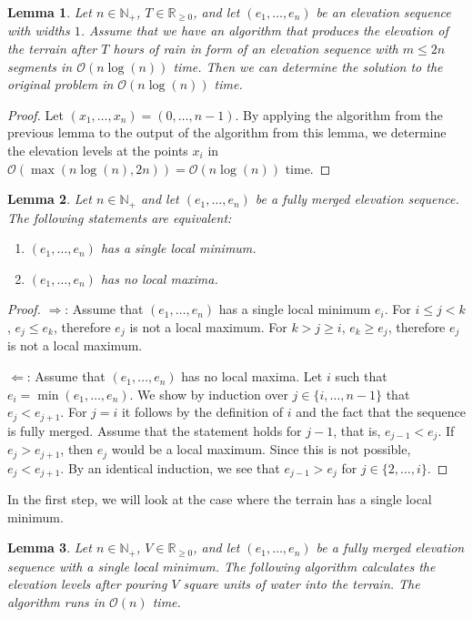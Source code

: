 \documentclass[11pt,a4paper]{article}
\newtheorem{lem}{Lemma}
\newcommand{\Np}{\mathbb{N}_+}
\newcommand{\bO}{\mathcal{O}}
\newcommand{\Rnn}{\mathbb{R}_{\ge0}}
\begin{document}
\begin{lem}
  Let $n\in\Np$, $T\in\Rnn$, and let $(e_1,\ldots,e_n)$ be an elevation sequence with widths $1$.
  Assume that we have an algorithm that produces the elevation of the terrain after $T$ hours of rain in form of an elevation sequence with $m \le 2n$ segments in $\bO(n\log(n))$ time.
  Then we can determine the solution to the original problem in $\bO(n\log(n))$ time.
\end{lem}

\begin{proof}
  Let $(x_1,\ldots,x_n) = (0,\ldots,n-1)$.
  By applying the algorithm from the previous lemma to the output of the algorithm from this lemma,
  we determine the elevation levels at the points $x_i$ in $\bO(\max(n\log(n), 2n)) = \bO(n\log(n))$ time.
\end{proof}

\begin{lem}
  Let $n\in\Np$ and let $(e_1,\ldots,e_n)$ be a fully merged elevation sequence.
  The following statements are equivalent:
  \begin{enumerate}
    \item $(e_1,\ldots,e_n)$ has a single local minimum.
    \item $(e_1,\ldots,e_n)$ has no local maxima.
  \end{enumerate}
\end{lem}

\begin{proof}
  $\Rightarrow$: Assume that $(e_1,\ldots,e_n)$ has a single local minimum $e_i$.
  For $i \le j < k$, $e_j \le e_k$, therefore $e_j$ is not a local maximum.
  For $k > j \ge i$, $e_k \ge e_j$, therefore $e_j$ is not a local maximum.

  $\Leftarrow$: Assume that $(e_1,\ldots,e_n)$ has no local maxima.
  Let $i$ such that $e_i = \min(e_1,\ldots,e_n)$.
  We show by induction over $j \in \{i,\ldots,n-1\}$ that $e_j < e_{j+1}$.
  For $j = i$ it follows by the definition of $i$ and the fact that the sequence is fully merged.
  Assume that the statement holds for $j-1$, that is, $e_{j-1} < e_j$.
  If $e_j > e_{j+1}$, then $e_j$ would be a local maximum.
  Since this is not possible, $e_j < e_{j+1}$.
  By an identical induction, we see that $e_{j-1} > e_j$ for $j \in \{2,\ldots,i\}$.
\end{proof}

In the first step, we will look at the case where the terrain has a single local minimum.

\begin{lem}
    \label{alg1}
    Let $n\in\Np$, $V\in\Rnn$, and let $(e_1,\ldots,e_n)$ be a fully merged elevation sequence with a single local minimum.
    The following algorithm calculates the elevation levels after pouring $V$ square units of water into the terrain.
    The algorithm runs in $\bO(n)$ time.
\end{lem}
\end{document}
